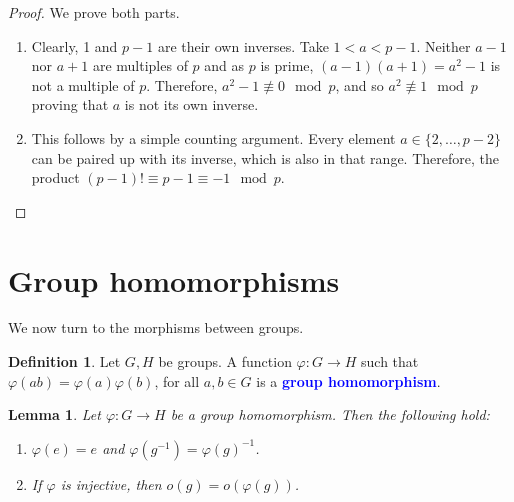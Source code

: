 \documentclass[12pt]{report}
\newcommand{\indx}[1]{\index{#1}\textbf{\textcolor{blue}{#1}}}
\renewcommand{\phi}{\varphi}
\newtheorem{lemma}[theorem]{Lemma}
\theoremstyle{definition}
\newtheorem{definition}[theorem]{Definition}
\begin{document}
\begin{proof}
  We prove both parts.
  \begin{enumerate}
  \item
    Clearly, 1 and \(p-1\) are their own inverses.
    Take \(1 < a < p -1\).
    Neither \(a-1\) nor \(a+1\) are multiples of \(p\) and as \(p\) is prime, \((a-1)(a+1) = a^{2} -1\) is not a multiple of \(p\).
    Therefore, \(a^{2}-1 \not\equiv 0 \mod p\), and so \(a^{2} \not\equiv 1 \mod p\) proving that \(a\) is not its own inverse.

  \item
    This follows by a simple counting argument.
    Every element \(a \in \{2, \ldots, p-2\}\) can be paired up with its inverse, which is also in that range.
    Therefore, the product \((p-1)! \equiv p-1 \equiv -1 \mod p\).
  \end{enumerate}
\end{proof}



\section{Group homomorphisms}
\label{sec:group-theory:group-homomorphisms}

We now turn to the morphisms between groups.

\begin{definition}
  \label{def:group-theory:group-homomorphism}
  Let \(G, H\) be groups.
  A function \(\phi : G \to H\) such that \(\phi(ab) = \phi(a) \phi(b)\), for all \(a, b \in G\) is a \indx{group homomorphism}.
\end{definition}

\begin{lemma}
  Let \(\phi : G \to H\) be a group homomorphism.
  Then the following hold:
  \begin{enumerate}
  \item
    \(\phi(e) = e\) and \(\phi(g^{-1}) = \phi(g) ^{-1}\).
  \item
    If \(\phi\) is injective, then \(o(g) = o\left(\phi(g)\right)\).
  \end{enumerate}
\end{lemma}
\end{document}
